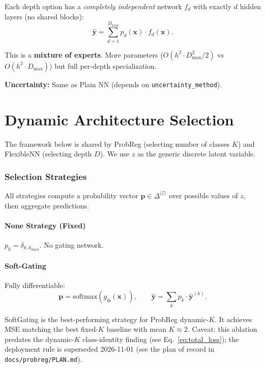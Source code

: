 \documentclass[11pt,a4paper]{article}
\theoremstyle{definition}
\newcommand{\bx}{\mathbf{x}}
\newcommand{\by}{\mathbf{y}}
\newcommand{\bphi}{\boldsymbol{\phi}}
\newcommand{\softmax}{\mathrm{softmax}}
\begin{document}
Each depth option has a \emph{completely independent} network $f_d$ with
exactly $d$ hidden layers (no shared blocks):
\[
  \hat{\by} = \sum_{d=1}^{D_{\max}} p_d(\bx) \cdot f_d(\bx).
\]

This is a \textbf{mixture of experts}. More parameters
($O(h^2 \cdot D_{\max}^2/2)$ vs $O(h^2 \cdot D_{\max})$) but full
per-depth specialization.

\textbf{Uncertainty:} Same as Plain NN (depends on \texttt{uncertainty\_method}).

\part{Dynamic Architecture Selection}

The framework below is shared by ProbReg (selecting number of classes $K$)
and FlexibleNN (selecting depth $D$). We use $z$ as the generic discrete
latent variable.

\section{Selection Strategies}
\label{sec:dynamic_k}

All strategies compute a probability vector $\mathbf{p} \in \Delta^{|\mathcal{Z}|}$
over possible values of $z$, then aggregate predictions.

\subsection{None Strategy (Fixed)}

$p_k = \delta_{k, k_{\mathrm{fixed}}}$. No gating network.

\subsection{Soft-Gating}

Fully differentiable:
\[
  \mathbf{p} = \softmax(g_\bphi(\bx)), \qquad
  \hat{\by} = \sum_{k} p_k \cdot \hat{\by}^{(k)}.
\]

\begin{implnote}
SoftGating is the best-performing strategy for ProbReg dynamic-$K$.
It achieves MSE matching the best fixed-$K$ baseline with mean $K \approx 2$.
Caveat: this ablation predates the dynamic-$K$ class-identity finding (see
Eq.~\eqref{eq:total_loss}); the deployment rule is superseded 2026-11-01 (see the plan of record in
\texttt{docs/probreg/PLAN.md}).
\end{implnote}
\end{document}
